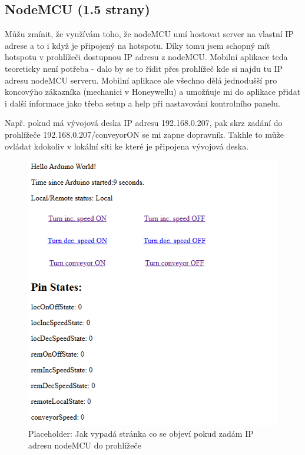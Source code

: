 \subsection{NodeMCU (1.5 strany)}

Můžu zmínit, že využívám toho, že nodeMCU umí hostovat server na vlastní IP adrese a to i když je připojený na hotspotu. Díky tomu jsem schopný mít hotspotu v prohlížeči dostupnou IP adresu z nodeMCU. Mobilní aplikace teda teoreticky není potřeba - dalo by se to řídit přes prohlížeč kde si najdu tu IP adresu nodeMCU serveru. Mobilní aplikace ale všechno dělá jednodušší pro koncovýho zákazníka (mechanici v Honeywellu) a umožňuje mi do aplikace přidat i další informace jako třeba setup a help při nastavování kontrolního panelu.

Např. pokud má vývojová deska IP adresu 192.168.0.207, pak skrz zadání do prohlížeče 192.168.0.207/conveyorON se mi zapne dopravník. Takhle to může ovládat kdokoliv v lokální síti ke které je připojena vývojová deska.

\begin{figure}[H]
    \centering
    \includegraphics[width=0.8\linewidth]{images/nodeMCUlandingPage.png}
    \caption{Placeholder: Jak vypadá stránka co se objeví pokud zadám IP adresu nodeMCU do prohlížeče}
    \label{fig:NodeMCUlandingPage}
\end{figure}



